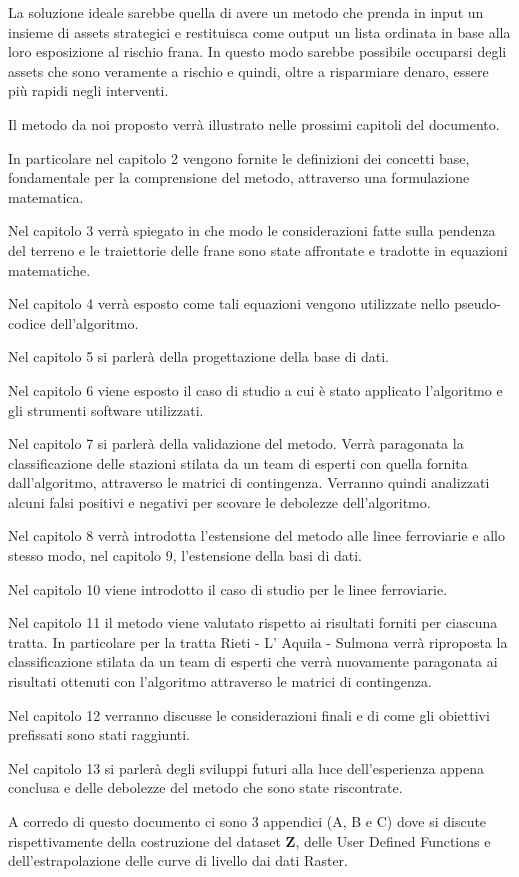 La soluzione ideale sarebbe quella di avere un metodo che prenda in input un insieme di assets strategici e restituisca come output un lista ordinata in base alla loro esposizione al rischio frana. In questo modo sarebbe possibile occuparsi degli assets che sono veramente a rischio e quindi, oltre a risparmiare denaro, essere più rapidi negli interventi.

Il metodo da noi proposto verrà illustrato nelle prossimi capitoli del documento. 

\noindent In particolare nel capitolo 2 vengono fornite le definizioni dei concetti base, fondamentale per la comprensione del metodo, attraverso una formulazione matematica. 

\noindent Nel capitolo 3 verrà spiegato in che modo le considerazioni fatte sulla pendenza del terreno e le traiettorie delle frane sono state affrontate e tradotte in equazioni matematiche. 

\noindent Nel capitolo 4 verrà esposto come tali equazioni vengono utilizzate nello pseudo-codice dell'algoritmo. 

\noindent Nel capitolo 5 si parlerà della progettazione della base di dati. 

\noindent Nel capitolo 6 viene esposto il caso di studio a cui è stato applicato l'algoritmo e gli strumenti software utilizzati. 

\noindent Nel capitolo 7 si parlerà della validazione del metodo. Verrà paragonata la classificazione delle stazioni stilata da un team di esperti con quella fornita dall'algoritmo, attraverso le matrici di contingenza. Verranno quindi analizzati alcuni falsi positivi e negativi per scovare le debolezze dell'algoritmo. 

\noindent Nel capitolo 8 verrà introdotta l'estensione del metodo alle linee ferroviarie e allo stesso modo, nel capitolo 9, l'estensione della basi di dati. 

\noindent Nel capitolo 10 viene introdotto il caso di studio per le linee ferroviarie. 

\noindent Nel capitolo 11 il metodo viene valutato rispetto ai risultati forniti per ciascuna tratta. In particolare per la tratta Rieti - L' Aquila - Sulmona verrà riproposta la classificazione stilata da un team di esperti che verrà nuovamente paragonata ai risultati ottenuti con l'algoritmo attraverso le matrici di contingenza. 

\noindent Nel capitolo 12 verranno discusse le considerazioni finali e di come gli obiettivi prefissati sono stati raggiunti. 

\noindent Nel capitolo 13 si parlerà degli sviluppi futuri alla luce dell'esperienza appena conclusa e delle debolezze del metodo che sono state riscontrate. 

\noindent A corredo di questo documento ci sono 3 appendici (A, B e C) dove si discute rispettivamente della costruzione del dataset $\mathbf{Z}$, delle User Defined Functions e dell'estrapolazione delle curve di livello dai dati Raster. 

